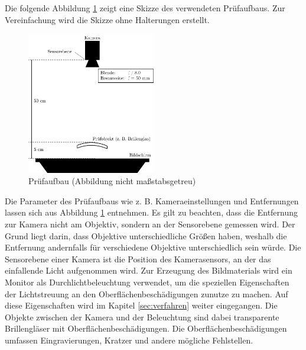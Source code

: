 Die folgende Abbildung \ref{img:pruefaufbau} zeigt eine Skizze des verwendeten Prüfaufbaus.
Zur Vereinfachung wird die Skizze ohne Halterungen erstellt.

\begin{figure}[H]
	\centering
	\includegraphics[width=0.5\textwidth]{03_sichtpruefungDurchLichtstreuung/pruefaufbau/figures/aufbau}
	\caption[Prüfaufbau]{Prüfaufbau (Abbildung nicht maßstabsgetreu)}
	\label{img:pruefaufbau}
\end{figure}

\noindent
Die Parameter des Prüfaufbaus wie z. B. Kameraeinstellungen und Entfernungen lassen sich aus Abbildung \ref{img:pruefaufbau} entnehmen.
Es gilt zu beachten, dass die Entfernung zur Kamera nicht am Objektiv, sondern an der Sensorebene gemessen wird.
Der Grund liegt darin, dass Objektive unterschiedliche Größen haben, weshalb die Entfernung andernfalls für verschiedene Objektive unterschiedlich sein würde.
Die Sensorebene einer Kamera ist die Position des Kamerasensors, an der das einfallende Licht aufgenommen wird.
Zur Erzeugung des Bildmaterials wird ein Monitor als Durchlichtbeleuchtung verwendet, um die speziellen Eigenschaften der Lichtstreuung an den Oberflächenbeschädigungen zunutze zu machen.
Auf diese Eigenschaften wird im Kapitel \ref{sec:verfahren} weiter eingegangen.
Die Objekte zwischen der Kamera und der Beleuchtung sind dabei transparente Brillengläser mit Oberflächenbeschädigungen.
Die Oberflächenbeschädigungen umfassen Eingravierungen, Kratzer und andere mögliche Fehlstellen.